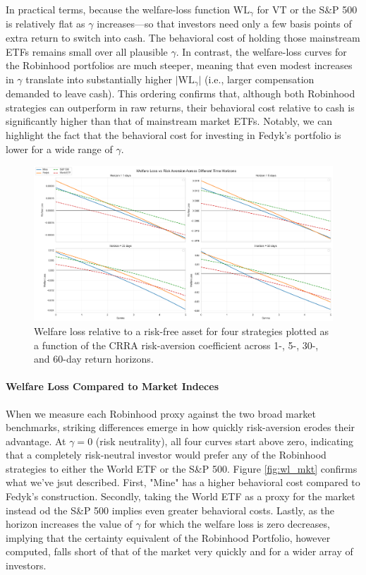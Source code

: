 In practical terms, because the welfare-loss function $\mathrm{WL}_\gamma$ for VT or the S\&P 500 is relatively flat as $\gamma$ increases—so that investors need only a few basis points of extra return to switch into cash. 
The behavioral cost of holding those mainstream ETFs remains small over all plausible $\gamma$. In contrast, the welfare-loss curves for the Robinhood portfolios are much steeper, 
meaning that even modest increases in $\gamma$ translate into substantially higher $\lvert\mathrm{WL}_\gamma\rvert$ (i.e., larger compensation demanded to leave cash). 
This ordering confirms that, although both Robinhood strategies can outperform in raw returns, their behavioral cost relative to cash is significantly higher than that of mainstream market ETFs.
Notably, we can highlight the fact that the behavioral cost for investing in Fedyk's portfolio is lower for a wide range of $\gamma$.
\begin{figure}[H]
    \centering
    \includegraphics[width=\linewidth]{../images/wl_rf.png}
    \caption{Welfare loss relative to a risk-free asset for four strategies plotted as a function of the CRRA risk-aversion coefficient across 1-, 5-, 30-, and 60-day return horizons.}
\label{fig:wl_rf}
\end{figure}    



\paragraph{Welfare Loss Compared to Market Indeces}
When we measure each Robinhood proxy against the two broad market benchmarks, striking differences emerge in how quickly risk-aversion erodes their advantage.  
At $\gamma=0$ (risk neutrality), all four curves start above zero, indicating that a completely risk-neutral investor would prefer any of the Robinhood strategies to either the World ETF or the S\&P 500.  
Figure \ref{fig:wl_mkt} confirms what we've jsut described.
First, "Mine" has a higher behavioral cost compared to Fedyk's construction.
Secondly, taking the World ETF as a proxy for the market instead od the S\&P 500 implies even greater behavioral costs.
Lastly, as the horizon increases the value of $\gamma$ for which the welfare loss is zero decreases, implying that the certainty equivalent of the Robinhood Portfolio, however computed, falls short of that of the market very quickly and for a wider array of investors.    

